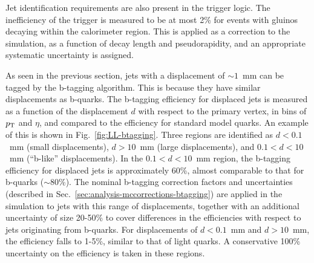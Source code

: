Jet identification requirements are also present in the trigger logic. The 
inefficiency of the trigger is measured to be at most 2\% for events with 
gluinos decaying within the calorimeter region. This is applied as a correction 
to the simulation, as a function of decay length and pseudorapidity, and an 
appropriate systematic uncertainty is assigned.

As seen in the previous section, jets with a displacement of $\sim1$~mm can be 
tagged by the b-tagging algorithm. This is because they have similar 
displacements as b-quarks.
The b-tagging efficiency for displaced jets is measured as a 
function of the displacement $d$ with respect to the primary vertex, in bins of 
${p_{\text T}}$ and $\eta$, and compared to the 
efficiency for standard model quarks. An example of this is shown in 
Fig.~\ref{fig:LL-btagging}. 
Three regions are identified as $d<0.1$~mm (small displacements), $d>10$~mm 
(large displacements), and $0.1<d<10$~mm (``b-like'' displacements). In the 
$0.1<d<10$~mm region, the b-tagging efficiency for displaced jets is 
approximately 60\%, almost comparable to that for b-quarks ($\sim80$\%). The 
nominal b-tagging correction factors and uncertainties (described in 
Sec.~\ref{sec:analysis-mccorrections-btagging}) are applied in the simulation 
to jets with this range of displacements, together with an additional 
uncertainty of size 20-50\% to cover differences in the efficiencies with 
respect to jets originating from b-quarks. For displacements of $d<0.1$~mm and 
$d>10$~mm, the efficiency falls to 1-5\%, similar to that of light quarks. A 
conservative 100\% uncertainty on the efficiency is taken in these regions.

